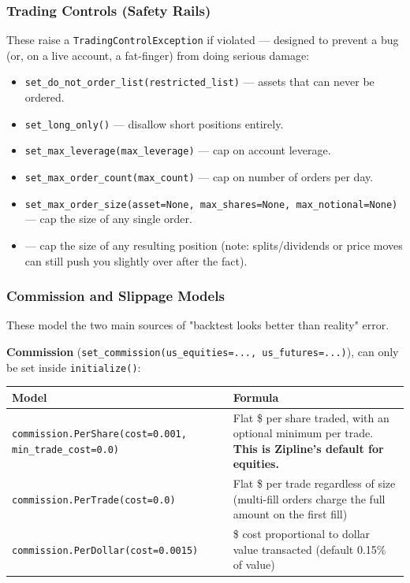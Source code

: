 \documentclass[12pt,openany]{book}
\theoremstyle{definition}
\theoremstyle{remark}
\begin{document}
\subsubsection{Trading Controls (Safety Rails)}

These raise a \texttt{TradingControlException} if violated — designed to prevent a bug (or, on a live account, a fat-finger) from doing serious damage:

\begin{itemize}
\item 
\texttt{set\_do\_not\_order\_list(restricted\_list)} — assets that can never be ordered.

\item 
\texttt{set\_long\_only()} — disallow short positions entirely.

\item 
\texttt{set\_max\_leverage(max\_leverage)} — cap on account leverage.

\item 
\texttt{set\_max\_order\_count(max\_count)} — cap on number of orders per day.

\item 
\texttt{set\_max\_order\_size(asset=None, max\_shares=None, max\_notional=None)} — cap the size of any single order.

\item 
{} —
cap the size of any resulting position (note: splits/dividends or price moves
can still push you slightly over after the fact).

\end{itemize}
\subsubsection{Commission and Slippage Models}

These model the two main sources of "backtest looks better than reality" error.

\textbf{Commission} (\texttt{set\_commission(us\_equities=..., us\_futures=...)}), can only be set inside \texttt{initialize()}:

\begin{longtable}{@{}L{0.46\textwidth}L{0.46\textwidth}@{}}
\toprule
\textbf{Model} & \textbf{Formula} \\
\midrule
\texttt{commission.PerShare(cost=0.001, min\_trade\_cost=0.0)} & Flat \$ per share traded, with an optional minimum per trade. \textbf{This is Zipline's default for equities.} \\
\texttt{commission.PerTrade(cost=0.0)} & Flat \$ per trade regardless of size (multi-fill orders charge the full amount on the first fill) \\
\texttt{commission.PerDollar(cost=0.0015)} & \$ cost proportional to dollar value transacted (default 0.15\% of value) \\
\bottomrule
\end{longtable}
\end{document}
